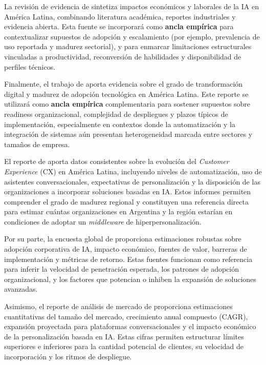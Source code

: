 La revisión de evidencia de \textcite{GerosaHermansen2025EconomicWorkforceAI} sintetiza impactos económicos y laborales de la IA en América Latina, combinando literatura académica, reportes industriales y evidencia abierta. Esta fuente se incorporará como \textbf{ancla empírica} para contextualizar supuestos de adopción y escalamiento (por ejemplo, prevalencia de uso reportada y madurez sectorial), y para enmarcar limitaciones estructurales vinculadas a productividad, reconversión de habilidades y disponibilidad de perfiles técnicos.

Finalmente, el trabajo de \textcite{atlantico2024_digital_transformation} aporta evidencia sobre el grado de transformación digital y madurez de adopción tecnológica en América Latina. Este reporte se utilizará como \textbf{ancla empírica} complementaria para sostener supuestos sobre readiness organizacional, complejidad de despliegues y plazos típicos de implementación, especialmente en contextos donde la automatización y la integración de sistemas aún presentan heterogeneidad marcada entre sectores y tamaños de empresa.


El reporte de \textcite{zendesk2024_cxtrends} aporta datos consistentes sobre la evolución del \emph{Customer Experience} (CX) en América Latina, incluyendo niveles de automatización, uso de asistentes conversacionales, expectativas de personalización y la disposición de las organizaciones a incorporar soluciones basadas en IA. Estos informes permiten comprender el grado de madurez regional y constituyen una referencia directa para estimar cuántas organizaciones en Argentina y la región estarían en condiciones de adoptar un \textit{middleware} de hiperpersonalización.


Por su parte, la encuesta global de \textcite{mckinsey2025stateofai} proporciona estimaciones robustas sobre adopción corporativa de IA, impacto económico, fuentes de valor, barreras de implementación y métricas de retorno. Estas fuentes funcionan como referencia para inferir la velocidad de penetración esperada, los patrones de adopción organizacional, y los factores que potencian o inhiben la expansión de soluciones avanzadas.


Asimismo, el reporte de análisis de mercado de \textcite{statista2024_latam_ai} proporciona estimaciones cuantitativas del tamaño del mercado, crecimiento anual compuesto (CAGR), expansión proyectada para plataformas conversacionales y el impacto económico de la personalización basada en IA. Estas cifras permiten estructurar límites superiores e inferiores para la cantidad potencial de clientes, su velocidad de incorporación y los ritmos de despliegue.


